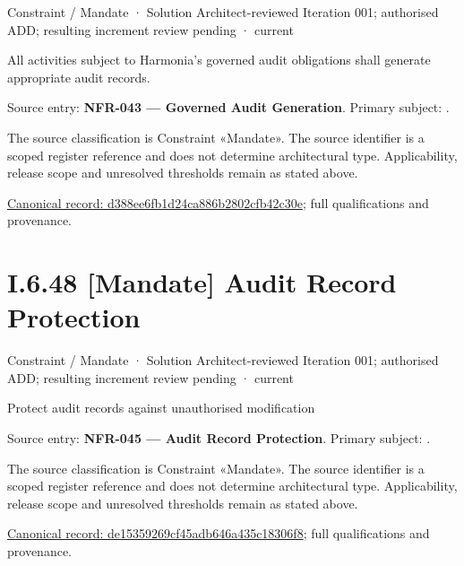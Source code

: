 \label{element:d388ee6fb1d24ca886b2802cfb42c30e}
{\small Constraint / Mandate · Solution Architect-reviewed Iteration 001; authorised ADD; resulting increment review pending · current}\par

All activities subject to Harmonia's governed audit obligations shall generate appropriate audit records.



Source entry: \textbf{NFR-043 — Governed Audit Generation}. Primary subject: \texttt{}.



The source classification is Constraint «Mandate». The source identifier is a scoped register reference and does not determine architectural type. Applicability, release scope and unresolved thresholds remain as stated above.


{\footnotesize \href{../../../../../../../continuum/motivation/constraint/mandate/d388ee6fb1d24ca886b2802cfb42c30e.md}{Canonical record: d388ee6fb1d24ca886b2802cfb42c30e}; full qualifications and provenance.}\par
\section*{I.6.48 [Mandate] Audit Record Protection}
\label{navigation:I.6.48}

\label{element:de15359269cf45adb646a435c18306f8}
{\small Constraint / Mandate · Solution Architect-reviewed Iteration 001; authorised ADD; resulting increment review pending · current}\par

Protect audit records against unauthorised modification



Source entry: \textbf{NFR-045 — Audit Record Protection}. Primary subject: \texttt{}.



The source classification is Constraint «Mandate». The source identifier is a scoped register reference and does not determine architectural type. Applicability, release scope and unresolved thresholds remain as stated above.


{\footnotesize \href{../../../../../../../continuum/motivation/constraint/mandate/de15359269cf45adb646a435c18306f8.md}{Canonical record: de15359269cf45adb646a435c18306f8}; full qualifications and provenance.}\par
